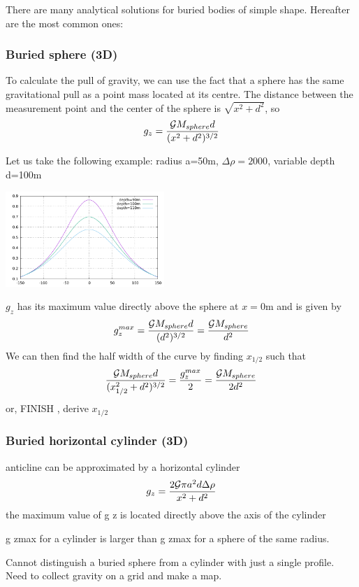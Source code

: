 
There are many analytical solutions for buried bodies of simple shape.
Hereafter are the most common ones:

\subsubsection{Buried sphere (3D)}

To calculate the pull of gravity, we can use the fact that a sphere has the same
gravitational pull as a point mass located at its centre. The distance between 
the measurement point and the center of the sphere is $\sqrt{x^2+d^2}$, so
\[
g_z = \frac{{\cal G} M_{sphere} d }{(x^2 + d^2)^{3/2}}
\]

Let us take the following example: 
radius a=50m, $\Delta \rho=2000$, variable depth d=100m

\begin{center}
\includegraphics[width=6cm]{images/gravity/buriedsphere}
\end{center}

$g_z$ has its maximum value directly above the sphere at $x=0$m and is 
given by 
\[
g_{z}^{max}
= \frac{{\cal G} M_{sphere} d }{(d^2)^{3/2}}
= \frac{{\cal G} M_{sphere}  }{d^2}
\]
We can then find the half width of the curve by finding $x_{1/2}$ such that 
\[
\frac{{\cal G} M_{sphere} d }{(x_{1/2}^2 + d^2)^{3/2}} =
\frac{g_{z}^{max}}{2} = \frac{ {\cal G} M_{sphere} }{2 d^2}
\]
or, 
FINISH , derive $x_{1/2}$


\subsubsection{Buried horizontal cylinder (3D)} 

anticline can be approximated by a horizontal cylinder
\[
g_z=\frac{2 {\cal G} \pi a^2 d \Delta \rho}{x^2+d^2}
\]
the maximum value of g z is located directly above the axis of the cylinder

g zmax for a cylinder is larger than g zmax for a sphere of the same radius.

Cannot distinguish a buried sphere from a cylinder with just a single profile. Need to
collect gravity on a grid and make a map.

